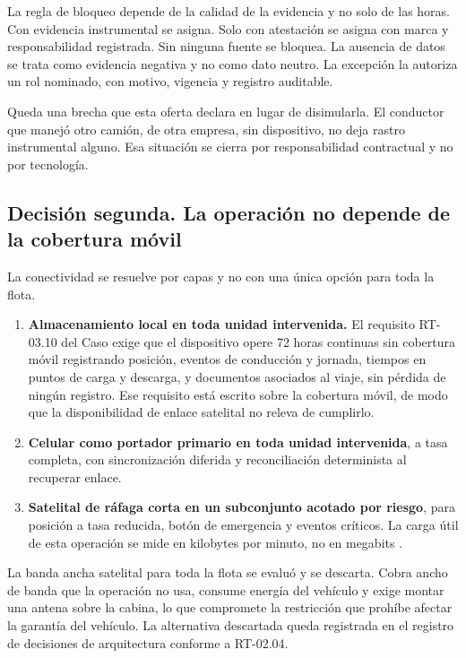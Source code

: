 La regla de bloqueo depende de la calidad de la evidencia y no solo de las horas. Con evidencia
instrumental se asigna. Solo con atestación se asigna con marca y responsabilidad registrada. Sin
ninguna fuente se bloquea. La ausencia de datos se trata como evidencia negativa y no como dato
neutro. La excepción la autoriza un rol nominado, con motivo, vigencia y registro auditable.

Queda una brecha que esta oferta declara en lugar de disimularla. El conductor que manejó otro
camión, de otra empresa, sin dispositivo, no deja rastro instrumental alguno. Esa situación se
cierra por responsabilidad contractual y no por tecnología.

\subsection{Decisión segunda. La operación no depende de la cobertura móvil}

La conectividad se resuelve por capas y no con una única opción para toda la flota.

\begin{enumerate}
    \item \textbf{Almacenamiento local en toda unidad intervenida.} El requisito RT-03.10 del Caso
    exige que el dispositivo opere 72 horas continuas sin cobertura móvil registrando posición,
    eventos de conducción y jornada, tiempos en puntos de carga y descarga, y documentos asociados
    al viaje, sin pérdida de ningún registro. Ese requisito está escrito sobre la cobertura móvil,
    de modo que la disponibilidad de enlace satelital no releva de cumplirlo.
    \item \textbf{Celular como portador primario en toda unidad intervenida}, a tasa completa, con
    sincronización diferida y reconciliación determinista al recuperar enlace.
    \item \textbf{Satelital de ráfaga corta en un subconjunto acotado por riesgo}, para posición a
    tasa reducida, botón de emergencia y eventos críticos. La carga útil de esta operación se mide
    en kilobytes por minuto, no en megabits \parencite{iridium_sbd}.
\end{enumerate}

La banda ancha satelital para toda la flota se evaluó y se descarta. Cobra ancho de banda que la
operación no usa, consume energía del vehículo y exige montar una antena sobre la cabina, lo que
compromete la restricción que prohíbe afectar la garantía del vehículo. La alternativa descartada
queda registrada en el registro de decisiones de arquitectura conforme a RT-02.04.

